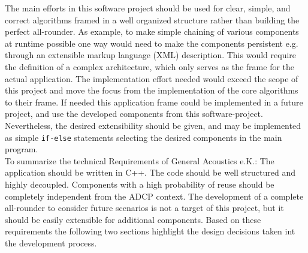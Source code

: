 The main efforts in this software project should be used for clear, simple, and correct algorithms framed in a well organized structure rather than building the perfect all-rounder. As example, to make simple chaining of various components at runtime possible one way would need to make the components persistent e.g. through an extensible markup language (XML) description. This would require the definition of a complex architecture, which only serves as the frame for the actual application. The implementation  effort needed would exceed the scope of this project and move the focus from the implementation of the core algorithms to their frame. If needed this application frame could be implemented in a future project, and use the developed components from this software-project. Nevertheless, the desired extensibility should be given, and may be implemented as simple \texttt{if-else} statements selecting the desired components in the main program.\\ 

To summarize the technical Requirements of General Acoustics e.K.: The application should be written in C++. The code should be well structured and highly decoupled. Components with a high probability of reuse should be completely independent from the ADCP context. The development of a complete all-rounder to consider future scenarios is not a target of this project, but it should be easily extensible for additional components. Based on these requirements the following two sections highlight the design decisions taken int the development process. 


